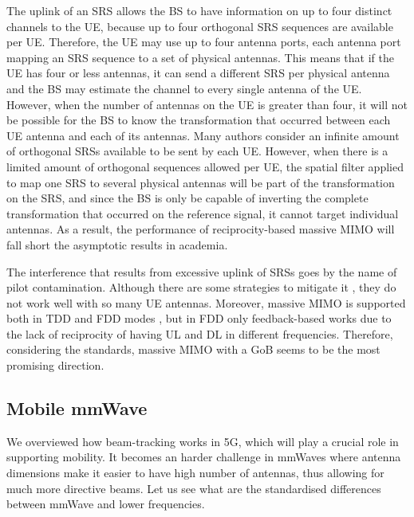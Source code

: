 The uplink of an \ac{SRS} allows the BS to have information on up to four distinct channels to the UE, because up to four orthogonal SRS sequences are available per UE. Therefore, the UE may use up to four antenna ports, each antenna port mapping an SRS sequence to a set of physical antennas. This means that if the UE has four or less antennas, it can send a different SRS per physical antenna and the BS may estimate the channel to every single antenna of the UE. However, when the number of antennas on the UE is greater than four, it will not be possible for the BS to know the transformation that occurred between each UE antenna and each of its antennas. Many authors \cite{7504159} consider an infinite amount of orthogonal SRSs available to be sent by each UE. However, when there is a limited amount of orthogonal sequences allowed per UE, the spatial filter applied to map one SRS to several physical antennas will be part of the transformation on the SRS, and since the BS is only be capable of inverting the complete transformation that occurred on the reference signal, it cannot target individual antennas. As a result, the performance of reciprocity-based massive MIMO will fall short the asymptotic results in academia.

The interference that results from excessive uplink of SRSs goes by the name of pilot contamination. Although there are some strategies to mitigate it \cite{8094949, 7996674}, they do not work well with so many UE antennas. Moreover, massive MIMO is supported both in \ac{TDD} and \ac{FDD} modes \cite{8255833}, but in \ac{FDD} only feedback-based works due to the lack of reciprocity of having \ac{UL} and \ac{DL} in different frequencies. Therefore, considering the standards, massive MIMO with a GoB seems to be the most promising direction.



\subsection*{Mobile mmWave}

We overviewed how beam-tracking works in 5G, which will play a crucial role in supporting mobility. It becomes an harder challenge in mmWaves where antenna dimensions make it easier to have high number of antennas, thus allowing for much more directive beams. Let us see what are the standardised differences between mmWave and lower frequencies. 

